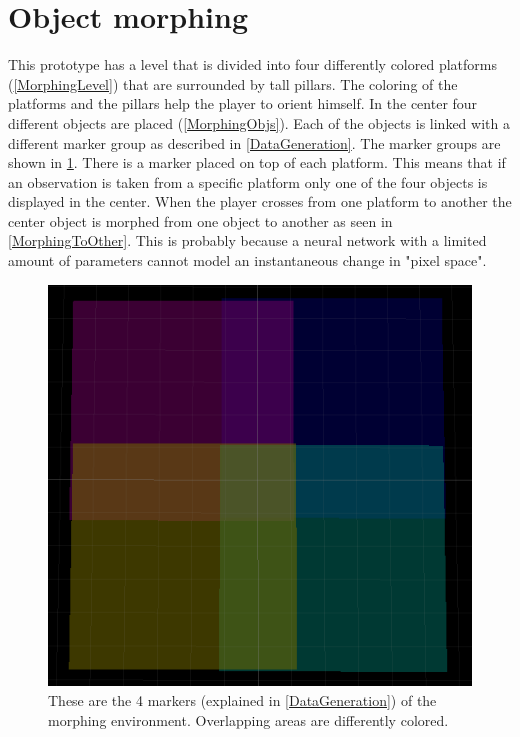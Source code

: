 \section{Object morphing}
This prototype has a level that is divided into four differently colored platforms (\cref{MorphingLevel}) that are surrounded by tall pillars. The coloring of the platforms and the pillars help the player to orient himself. In the center four different objects are placed (\cref{MorphingObjs}). Each of the objects is linked with a different marker group as described in \cref{DataGeneration}. The marker groups are shown in \cref{MorphingMarkers}. There is a marker placed on top of each platform. This means that if an observation is taken from a specific platform only one of the four objects is displayed in the center. When the player crosses from one platform to another the center object is morphed from one object to another as seen in \cref{MorphingToOther}. This is probably because a neural network with a limited amount of parameters cannot model an instantaneous change in "pixel space".

\begin{figure}[p]
  \centering
  \includegraphics[width=\imgWidth]{images/workflow/object_morphing/CaptureAreas.png}
  \caption{These are the 4 markers (explained in \cref{DataGeneration}) of the morphing environment. Overlapping areas are differently colored.}
  \label{MorphingMarkers}
\end{figure}

